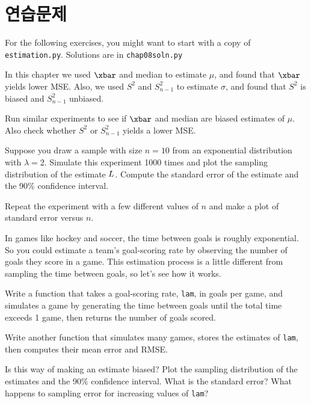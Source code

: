 \section{연습문제}

For the following exercises, you might want to start with a copy of
{\tt estimation.py}.  Solutions are in \verb"chap08soln.py"

\begin{exercise}

In this chapter we used $\xbar$ and median to estimate $\mu$, and
found that $\xbar$  yields lower MSE.
Also, we used $S^2$ and $S_{n-1}^2$ to estimate $\sigma$, and found that
$S^2$ is biased and $S_{n-1}^2$ unbiased.

Run similar experiments to see if $\xbar$ and median are biased estimates
of $\mu$.
Also check whether $S^2$ or $S_{n-1}^2$ yields a lower MSE.

\end{exercise}


\begin{exercise}

Suppose you draw a sample with size $n=10$ from 
an exponential distribution with $\lambda=2$.  Simulate
this experiment 1000 times and plot the sampling distribution of
the estimate $L$.  Compute the standard error of the estimate
and the 90\% confidence interval.

Repeat the experiment with a few different values of $n$ and make
a plot of standard error versus $n$.


\end{exercise}


\begin{exercise}

In games like hockey and soccer, the time between goals is
roughly exponential.  So you could estimate a team's goal-scoring rate
by observing the number of goals they score in a game.  This
estimation process is a little different from sampling the time
between goals, so let's see how it works.

Write a function that takes a goal-scoring rate, {\tt lam}, in goals
per game, and simulates a game by generating the time between goals
until the total time exceeds 1 game, then returns the number of goals
scored.

Write another function that simulates many games, stores the
estimates of {\tt lam}, then computes their mean error and RMSE.

Is this way of making an estimate biased?  Plot the sampling
distribution of the estimates and the 90\% confidence interval.  What
is the standard error?  What happens to sampling error for increasing
values of {\tt lam}?

\end{exercise}


